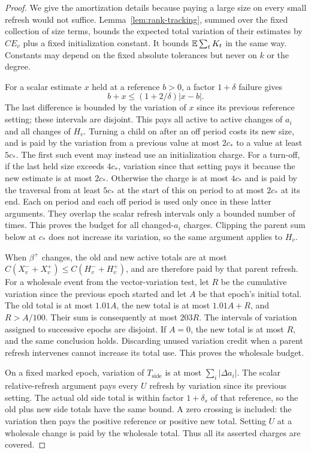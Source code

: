 \begin{proof}
We give the amortization details because paying a large size on every
small refresh would not suffice.  Lemma~\ref{lem:rank-tracking}, summed
over the fixed collection of size terms, bounds the expected total
variation of their estimates by $CE_v$ plus a fixed initialization
constant.  It bounds $\mathbb E\sum_tK_t$ in the same way.  Constants may depend
on the fixed absolute tolerances but never on $k$ or the degree.

For a scalar estimate $x$ held at a reference $b>0$, a factor
$1+\delta$ failure gives
\[
             b+x\le(1+2/\delta)|x-b|.
\]
The last difference is bounded by the variation of $x$ since its previous
reference setting; these intervals are disjoint.  This pays all active
to active changes of $a_i$ and all changes of $H_v$.
Turning a child on after an off period costs its new size, and is paid
by the variation from a previous value at most $2c_*$ to a value at least
$5c_*$.  The first such event may instead use an initialization charge.
For a turn-off, if the last held size exceeds $4c_*$, variation since
that setting pays it because the new estimate is at most $2c_*$.
Otherwise the charge is at most $4c_*$ and is paid by the traversal
from at least $5c_*$ at the start of this on period to at most $2c_*$
at its end.  Each on period and each off period is used only once in
these latter arguments.  They overlap the scalar refresh intervals
only a bounded number of times.  This proves the budget for all
changed-$a_i$ charges.  Clipping the parent sum below at $c_*$ does
not increase its variation, so the same argument applies to $H_v$.

When $\beta^+$ changes, the old and new active totals are at most
$C(X_v^-+X_v^+)\le C(H_v^-+H_v^+)$, and are therefore paid by that
parent refresh.  For a wholesale event from the vector-variation test,
let $R$ be the cumulative variation since the previous epoch started
and let $A$ be that epoch's initial total.  The old total is at most
$1.01A$, the new total is at most $1.01A+R$, and $R>A/100$.
Their sum is consequently at most $203R$.  The intervals of variation
assigned to successive epochs are disjoint.  If $A=0$, the new total
is at most $R$, and the same conclusion holds.  Discarding unused
variation credit when a parent refresh intervenes cannot increase its
total use.  This proves the wholesale budget.

On a fixed marked epoch, variation of $T_{\mathrm{side}}$ is at most
$\sum_i|\Delta a_i|$.  The scalar relative-refresh argument pays every
$U$ refresh by variation since its previous setting.  The actual old
side total is within factor $1+\delta_s$ of that reference, so the
old plus new side totals have the same bound.  A zero crossing is
included: the variation then pays the positive reference or positive
new total.  Setting $U$ at a wholesale change is paid by the wholesale
total.  Thus all its asserted charges are covered.


\end{proof}
